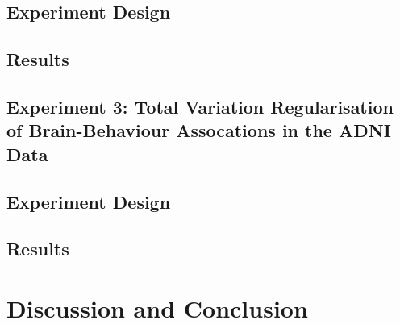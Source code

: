 \subsection{Experiment Design}
\subsection{Results}

\subsection{Experiment 3: Total Variation Regularisation of Brain-Behaviour Assocations in the ADNI Data}
\subsection{Experiment Design}
\subsection{Results}


\section{Discussion and Conclusion}


